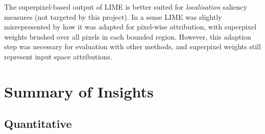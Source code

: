\documentclass[main]{subfiles}
\begin{document}
The superpixel-based output of LIME is better suited for \textit{localisation} saliency measures (not targeted by this project). In a sense LIME was slightly misrepresented by how it was adapted for pixel-wise attribution, with superpixel weights brushed over all pixels in each bounded region. However, this adaption step was necessary for evaluation with other methods, and superpixel weights still represent input space attributions.


\newpage
\section{Summary of Insights}
\subsection{Quantitative}
\end{document}
